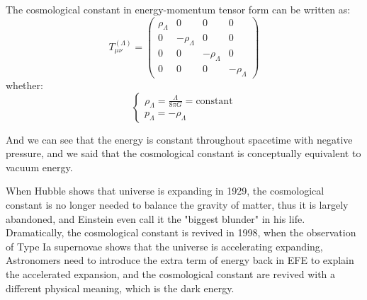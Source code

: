 \clearpage
\begin{theory}
    The cosmological constant in energy-momentum tensor form can be written as:
    \[
        T^{(\Lambda)}_{\mu\nu} = \begin{pmatrix}
            \rho_\Lambda & 0 & 0 & 0 \\
            0 & -\rho_\Lambda & 0 & 0 \\
            0 & 0 & -\rho_\Lambda & 0 \\
            0 & 0 & 0 & -\rho_\Lambda
        \end{pmatrix}
    \]
    whether:
    \[
        \begin{cases}
            \rho_\Lambda = \frac{\Lambda}{8\pi G} = \text{constant} \\
            p_\Lambda = -\rho_\Lambda
        \end{cases}
    \]

    And we can see that the energy is constant throughout spacetime with negative pressure, and we said that the cosmological constant is conceptually equivalent to vacuum energy. \\
\end{theory}


\bigskip \noindent
\begin{extra}
    When Hubble shows that universe is expanding in 1929, the cosmological constant is no longer needed to balance the gravity of matter, thus it is largely abandoned, and Einstein even call it the "biggest blunder" in his life. \\

    Dramatically, the cosmological constant is revived in 1998, when the observation of Type Ia supernovae shows that the universe is accelerating expanding, Astronomers need to introduce the extra term of energy back in EFE to explain the accelerated expansion, and the cosmological constant are revived with a different physical meaning, which is the dark energy.
\end{extra}

